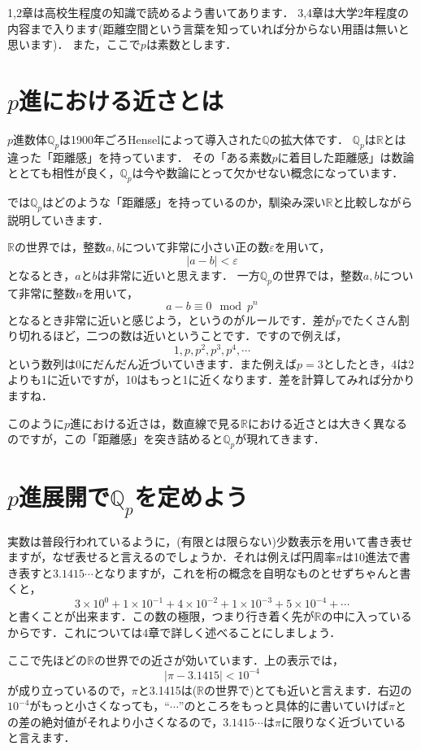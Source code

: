 \documentclass[./main]{subfiles}
\theoremstyle{definition}
\newcommand{\Q}{\mathbb{Q}}%
\newcommand{\Qp}{\mathbb{Q}_p}%
\newcommand{\R}{\mathbb{R}}%
\newcommand{\abs}[1]{\left\lvert#1\right\rvert}%
\begin{document}
 


1,2章は高校生程度の知識で読めるよう書いてあります．
3,4章は大学2年程度の内容まで入ります(距離空間という言葉を知っていれば分からない用語は無いと思います)．
また，ここで$p$は素数とします．

\section{$p$進における近さとは}

$p$進数体$\Qp$は1900年ごろHenselによって導入された$\Q$の拡大体です．
$\Qp$は$\R$とは違った「距離感」を持っています．
その「ある素数$p$に着目した距離感」は数論ととても相性が良く，$\Qp$は今や数論にとって欠かせない概念になっています．

では$\Qp$はどのような「距離感」を持っているのか，馴染み深い$\R$と比較しながら説明していきます．

$\R$の世界では，整数$a,b$について非常に小さい正の数$\varepsilon$を用いて，
\[
\abs{a-b}<\varepsilon
\]
となるとき，$a$と$b$は非常に近いと思えます．
一方$\Qp$の世界では，整数$a,b$について非常に整数$n$を用いて，
\[
a-b \equiv 0 \mod{p^n}
\]
となるとき非常に近いと感じよう，というのがルールです．差が$p$でたくさん割り切れるほど，二つの数は近いということです．ですので例えば，
\[
1,p,p^2,p^3,p^4,\cdots
\]
という数列は0にだんだん近づいていきます．また例えば$p=3$としたとき，4は2よりも1に近いですが，10はもっと1に近くなります．差を計算してみれば分かりますね．

このように$p$進における近さは，数直線で見る$\R$における近さとは大きく異なるのですが，この「距離感」を突き詰めると$\Qp$が現れてきます．


\section{$p$進展開で$\Qp$を定めよう}

実数は普段行われているように，(有限とは限らない)少数表示を用いて書き表せますが，なぜ表せると言えるのでしょうか．それは例えば円周率$\pi$は10進法で書き表すと$3.1415\cdots$となりますが，これを桁の概念を自明なものとせずちゃんと書くと，
\[
3 \times 10^0 + 1 \times 10^{-1} + 4 \times 10^{-2} + 1\times 10^{-3} + 5 \times 10^{-4}+ \cdots
\]
と書くことが出来ます．この数の極限，つまり行き着く先が$\R$の中に入っているからです．これについては4章で詳しく述べることにしましょう．

ここで先ほどの$\R$の世界での近さが効いています．上の表示では，
\[
\abs{\pi-3.1415}<10^{-4}
\]
が成り立っているので，$\pi$と3.1415は($\R$の世界で)とても近いと言えます．右辺の$10^{-4}$がもっと小さくなっても，``$\cdots$''のところをもっと具体的に書いていけば$\pi$との差の絶対値がそれより小さくなるので，$3.1415\cdots$は$\pi$に限りなく近づいていると言えます．
\end{document}
